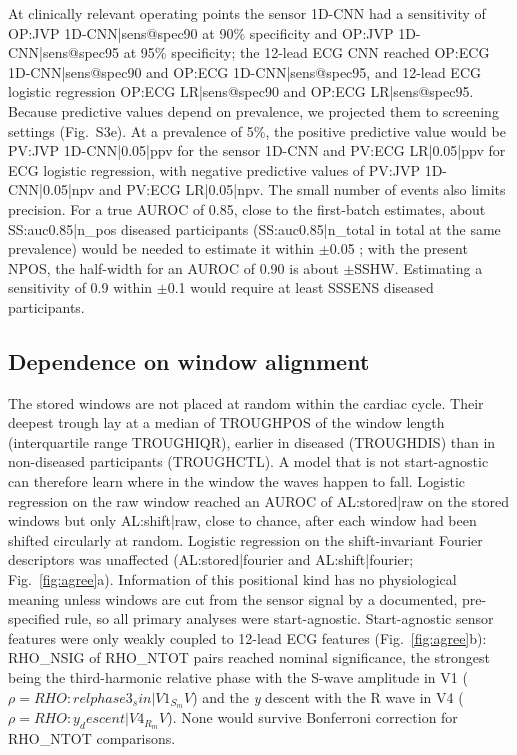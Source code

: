 \documentclass[11pt]{article}
\begin{document}
At clinically relevant operating points the sensor 1D-CNN had a sensitivity of {{OP:JVP 1D-CNN|sens@spec90}} at 90\% specificity and {{OP:JVP 1D-CNN|sens@spec95}} at 95\% specificity; the 12-lead ECG CNN reached {{OP:ECG 1D-CNN|sens@spec90}} and {{OP:ECG 1D-CNN|sens@spec95}}, and 12-lead ECG logistic regression {{OP:ECG LR|sens@spec90}} and {{OP:ECG LR|sens@spec95}}. Because predictive values depend on prevalence, we projected them to screening settings (Fig.~S3e). At a prevalence of 5\%, the positive predictive value would be {{PV:JVP 1D-CNN|0.05|ppv}} for the sensor 1D-CNN and {{PV:ECG LR|0.05|ppv}} for ECG logistic regression, with negative predictive values of {{PV:JVP 1D-CNN|0.05|npv}} and {{PV:ECG LR|0.05|npv}}. The small number of events also limits precision. For a true AUROC of 0.85, close to the first-batch estimates, about {{SS:auc0.85|n_pos}} diseased participants ({{SS:auc0.85|n_total}} in total at the same prevalence) would be needed to estimate it within $\pm$0.05 \cite{hanley1982meaning}; with the present {{NPOS}}, the half-width for an AUROC of 0.90 is about $\pm${{SSHW}}. Estimating a sensitivity of 0.9 within $\pm$0.1 would require at least {{SSSENS}} diseased participants.

\subsection*{Dependence on window alignment}
The stored windows are not placed at random within the cardiac cycle. Their deepest trough lay at a median of {{TROUGHPOS}} of the window length (interquartile range {{TROUGHIQR}}), earlier in diseased ({{TROUGHDIS}}) than in non-diseased participants ({{TROUGHCTL}}). A model that is not start-agnostic can therefore learn where in the window the waves happen to fall. Logistic regression on the raw window reached an AUROC of {{AL:stored|raw}} on the stored windows but only {{AL:shift|raw}}, close to chance, after each window had been shifted circularly at random. Logistic regression on the shift-invariant Fourier descriptors was unaffected ({{AL:stored|fourier}} and {{AL:shift|fourier}}; Fig.~\ref{fig:agree}a). Information of this positional kind has no physiological meaning unless windows are cut from the sensor signal by a documented, pre-specified rule, so all primary analyses were start-agnostic. Start-agnostic sensor features were only weakly coupled to 12-lead ECG features (Fig.~\ref{fig:agree}b): {{RHO_NSIG}} of {{RHO_NTOT}} pairs reached nominal significance, the strongest being the third-harmonic relative phase with the S-wave amplitude in V1 ($\rho={{RHO:relphase3_sin|V1_S_mV}}$) and the \textit{y} descent with the R wave in V4 ($\rho={{RHO:y_descent|V4_R_mV}}$). None would survive Bonferroni correction for {{RHO_NTOT}} comparisons.
\end{document}
